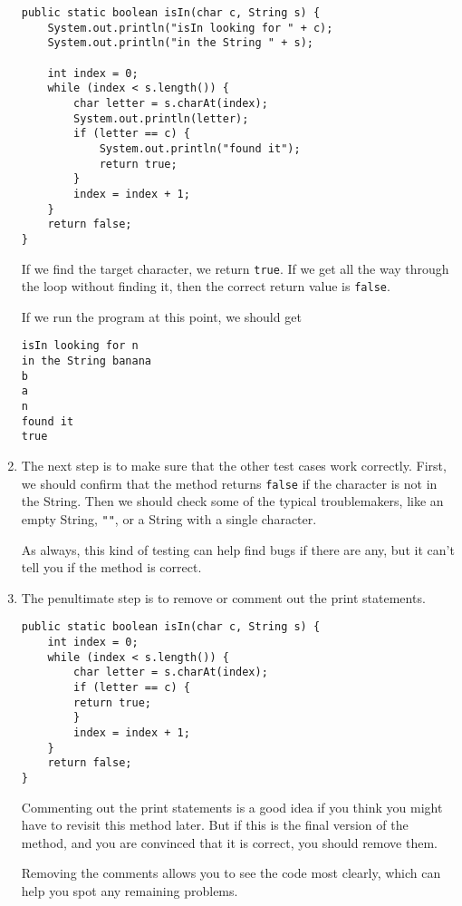 \documentclass{book}
\begin{document}
\begin{enumerate}
\begin{verbatim}
public static boolean isIn(char c, String s) {
    System.out.println("isIn looking for " + c);
    System.out.println("in the String " + s);

    int index = 0;
    while (index < s.length()) {
        char letter = s.charAt(index);
        System.out.println(letter);
        if (letter == c) {
            System.out.println("found it");
            return true;
        }
        index = index + 1;
    }
    return false;
}
\end{verbatim}

If we find the target character, we return {\tt true}.
If we get all the way through the loop without finding it, then
the correct return value is {\tt false}.

If we run the program at this point, we should get

\begin{verbatim}
isIn looking for n
in the String banana
b
a
n
found it
true
\end{verbatim}


\item The next step is to make sure that the other test cases
work correctly.  First, we should confirm that the method returns
{\tt false} if the character is not in the String.
Then we should check some of the typical troublemakers, like
an empty String, {\tt ""}, or a String with a single character.

As always, this kind of testing can help find bugs if there
are any, but it can't tell you if the method is correct.

\item The penultimate step is to remove or comment out the print
statements.

\begin{verbatim}
public static boolean isIn(char c, String s) {
    int index = 0;
    while (index < s.length()) {
        char letter = s.charAt(index);
        if (letter == c) {
	    return true;
        }
        index = index + 1;
    }
    return false;
}
\end{verbatim}

Commenting out the print statements is a good idea if you
think you might have to revisit this method later.  But if
this is the final version of the method, and you are convinced
that it is correct, you should remove them.

Removing the comments allows you to see the code most clearly,
which can help you spot any remaining problems.


\end{enumerate}
\end{document}
